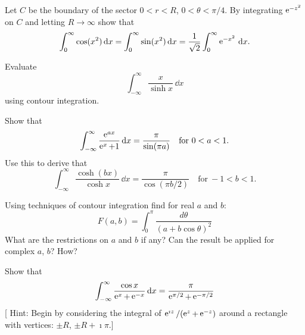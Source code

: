 {%
\begin{Exercise}
  \label{exercise cos x^2}
  Let $C$ be the boundary of the sector $0 < r < R$, 
  $0 < \theta < \pi / 4$.  By integrating $\mathop{\mathrm{e}}\nolimits^{-z^2}$ on $C$ and letting 
  $R \to \infty$ show that
  \[
  \int_0^\infty \cos(x^2)\,\mathrm{d} x = \int_0^\infty \sin(x^2)\,\mathrm{d} x 
  = \frac{1}{\sqrt{2}} \int_0^\infty \mathop{\mathrm{e}}\nolimits^{-x^2}\,\mathrm{d} x.
  \]

\end{Exercise}



\begin{Exercise}
  \label{exercise x/sinh x}
  Evaluate
  \[
  \int_{-\infty}^\infty \frac{x}{\sinh x}\,\dd x
  \]
  using contour integration.

\end{Exercise}



\begin{Exercise}
  \label{exercise e ax / (e x + 1)}
  Show that
  \[
  \int_{-\infty}^\infty \frac{\mathop{\mathrm{e}}\nolimits^{a x}}{\mathop{\mathrm{e}}\nolimits^x + 1} \,\mathrm{d} x = \frac{\pi}{\sin(\pi a)}
  \quad \mathrm{for}\ 0 < a < 1.
  \]
  Use this to derive that
  \[
  \int_{-\infty}^\infty \frac{\cosh(b x)}{\cosh x} \,\dd x = \frac{\pi}{\cos(\pi b/2)}
  \quad \mathrm{for}\ -1 < b < 1.
  \]

\end{Exercise}







\begin{Exercise}
  \label{exercise 1/(a + b cos theta)^2}
  Using techniques of contour integration find for real $a$ and $b$:
  \[
  F(a,b) = \int_0^\pi \frac{ d \theta }{ (a + b \cos \theta)^2 }
  \]
  What are the restrictions on $a$ and $b$ if any?  Can the result be applied
  for complex $a$, $b$?  How?

\end{Exercise}






\begin{Exercise}
  \label{exercise cos x / (e x + e -x)}
  Show that
  \[
  \int_{-\infty}^\infty \frac{\cos x}{\mathop{\mathrm{e}}\nolimits^x + \mathop{\mathrm{e}}\nolimits^{-x} } \,\mathrm{d} x 
  = \frac{\pi}{\mathop{\mathrm{e}}\nolimits^{\pi/2} + \mathop{\mathrm{e}}\nolimits^{-\pi/2} }
  \]
  [ Hint:  Begin by considering the integral of $\mathop{\mathrm{e}}\nolimits^{\imath z} / (\mathop{\mathrm{e}}\nolimits^z + \mathop{\mathrm{e}}\nolimits^{-z})$
  around a rectangle with vertices:
  $\pm R$, $\pm R + \imath \pi$.]


\end{Exercise}}

